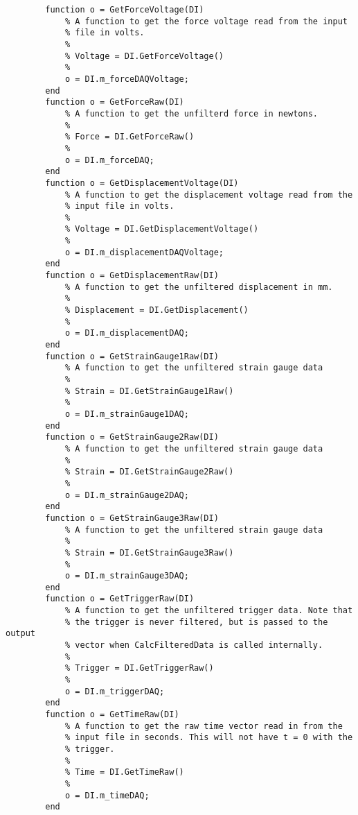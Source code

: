 \begin{lstlisting}
        function o = GetForceVoltage(DI)
            % A function to get the force voltage read from the input
            % file in volts.
            %
            % Voltage = DI.GetForceVoltage()
            %
            o = DI.m_forceDAQVoltage;
        end
        function o = GetForceRaw(DI)
            % A function to get the unfilterd force in newtons.
            %
            % Force = DI.GetForceRaw()
            %
            o = DI.m_forceDAQ;
        end
        function o = GetDisplacementVoltage(DI)
            % A function to get the displacement voltage read from the
            % input file in volts.
            %
            % Voltage = DI.GetDisplacementVoltage()
            %
            o = DI.m_displacementDAQVoltage;
        end
        function o = GetDisplacementRaw(DI)
            % A function to get the unfiltered displacement in mm.
            %
            % Displacement = DI.GetDisplacement()
            %
            o = DI.m_displacementDAQ;
        end
        function o = GetStrainGauge1Raw(DI)
            % A function to get the unfiltered strain gauge data
            %
            % Strain = DI.GetStrainGauge1Raw()
            %
            o = DI.m_strainGauge1DAQ;
        end
        function o = GetStrainGauge2Raw(DI)
            % A function to get the unfiltered strain gauge data
            %
            % Strain = DI.GetStrainGauge2Raw()
            %
            o = DI.m_strainGauge2DAQ;
        end
        function o = GetStrainGauge3Raw(DI)
            % A function to get the unfiltered strain gauge data
            %
            % Strain = DI.GetStrainGauge3Raw()
            %
            o = DI.m_strainGauge3DAQ;
        end
        function o = GetTriggerRaw(DI)
            % A function to get the unfiltered trigger data. Note that
            % the trigger is never filtered, but is passed to the output
            % vector when CalcFilteredData is called internally.
            %
            % Trigger = DI.GetTriggerRaw()
            %
            o = DI.m_triggerDAQ;
        end
        function o = GetTimeRaw(DI)
            % A function to get the raw time vector read in from the
            % input file in seconds. This will not have t = 0 with the
            % trigger.
            %
            % Time = DI.GetTimeRaw()
            %
            o = DI.m_timeDAQ;
        end
        

\end{lstlisting}
